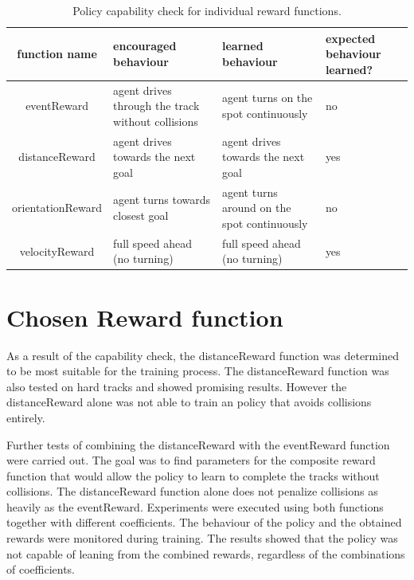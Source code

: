 \begin{table}
    \begin{center}
        \begin{tabular}{|| c | p{} | p{} | p{} ||}
            \hline
            function name     & encouraged behaviour                                & learned behaviour                           & expected behaviour learned? \\ [0.5ex]
            \hline\hline
            eventReward       & agent drives through the track without collisions & agent turns on the spot continuously        & no                          \\
            \hline
            distanceReward    & agent drives towards the next goal                  & agent drives towards the next goal          & yes                         \\
            \hline
            orientationReward & agent turns towards closest goal                    & agent turns around on the spot continuously & no                          \\
            \hline
            velocityReward    & full speed ahead (no turning)                       & full speed ahead (no turning)               & yes                         \\
            \hline
        \end{tabular}
    \end{center}
    \caption{Policy capability check for individual reward functions.}
    \label{table:reward_functions_behaviour}
\end{table}

\section{Chosen Reward function}

As a result of the capability check, the distanceReward function was determined to be most suitable for the training process. The distanceReward function was also tested on hard tracks and showed promising results. However the distanceReward alone was not able to train an policy that avoids collisions entirely.

Further tests of combining the distanceReward with the eventReward function were carried out. The goal was to find parameters for the composite reward function that would allow the policy to learn to complete the tracks without collisions. The distanceReward function alone does not penalize collisions as heavily as the eventReward.
Experiments were executed using both functions together with different coefficients. The behaviour of the policy and the obtained rewards were monitored during training. The results showed that the policy was not capable of leaning from the combined rewards, regardless of the combinations of coefficients.

